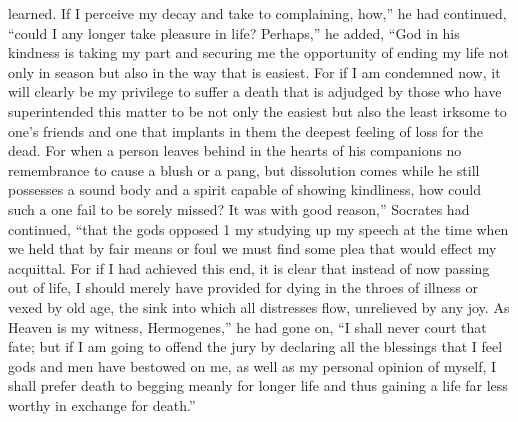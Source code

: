 \documentclass[12pt]{article}
\begin{document}
learned. If I perceive my decay and take to complaining, how,'' he had
continued, ``could I any longer take pleasure in life? Perhaps,'' he added,
``God in his kindness is taking my part and securing me the opportunity of
ending my life not only in season but also in the way that is easiest. For if I
am condemned now, it will clearly be my privilege to suffer a death that is
adjudged by those who have superintended this matter to be not only the easiest
but also the least irksome to one's friends and one that implants in them the
deepest feeling of loss for the dead. For when a person leaves behind in the
hearts of his companions no remembrance to cause a blush or a pang, but
dissolution comes while he still possesses a sound body and a spirit capable of
showing kindliness, how could such a one fail to be sorely missed? It was with
good reason,'' Socrates had continued, ``that the gods opposed 1 my studying up
my speech at the time when we held that by fair means or foul we must find some
plea that would effect my acquittal. For if I had achieved this end, it is
clear that instead of now passing out of life, I should merely have provided
for dying in the throes of illness or vexed by old age, the sink into which all
distresses flow, unrelieved by any joy. As Heaven is my witness, Hermogenes,''
he had gone on, ``I shall never court that fate; but if I am going to offend
the jury by declaring all the blessings that I feel gods and men have bestowed
on me, as well as my personal opinion of myself, I shall prefer death to
begging meanly for longer life and thus gaining a life far less worthy in
exchange for death.''
\end{document}
